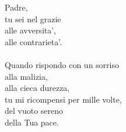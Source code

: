\begin{haiku}
    Padre,\\
    tu sei nel grazie\\
    alle avversita',\\
    alle contrarieta'.\\
    \leavevmode\\
    Quando rispondo con un sorriso\\
    alla malizia, \\
    alla cieca durezza,\\
    tu mi ricompensi per mille volte,\\
    del vuoto sereno \\
    della Tua pace.\\
\end{haiku}


